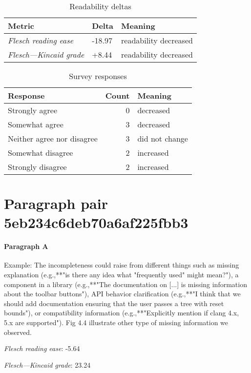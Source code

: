 \bigskip\begin{table}[!h]
\centering
\begin{tabular}{lll}
\toprule
               \textbf{Metric} & \textbf{Delta} &       \textbf{Meaning} \\
\midrule
    \emph{Flesch reading ease} &         -18.97 &  readability decreased \\
 \emph{Flesch---Kincaid grade} &          +8.44 &  readability decreased \\
\bottomrule
\end{tabular}
\caption*{Readability deltas}\end{table}

\begin{table}[!h]
\centering
\begin{tabular}{lrl}
\toprule
          \textbf{Response} &  \textbf{Count} & \textbf{Meaning} \\
\midrule
             Strongly agree &               0 &        decreased \\
             Somewhat agree &               3 &        decreased \\
 Neither agree nor disagree &               3 &   did not change \\
          Somewhat disagree &               2 &        increased \\
          Strongly disagree &               2 &        increased \\
\bottomrule
\end{tabular}
\caption*{Survey responses}\end{table}


\newpage
\section{Paragraph pair 5eb234c6deb70a6af225fbb3}
\paragraph{Paragraph A}
Example: The incompleteness could raise from different things such as missing explanation (e.g.,**"is there any idea what "frequently used" might mean?"), a component in a library (e.g.,**"The documentation on [...] is missing information about the toolbar buttons"), API behavior clarification (e.g.,**"I think that we should add documentation ensuring that the user passes a tree with reset bounds"), or compatibility information (e.g.,**"Explicitly mention if clang 4.x, 5.x are supported"). Fig 4.4 illustrate other type of missing information we observed.\par\medskip
\emph{Flesch reading ease}: -5.64\par
\emph{Flesch---Kincaid grade}: 23.24

